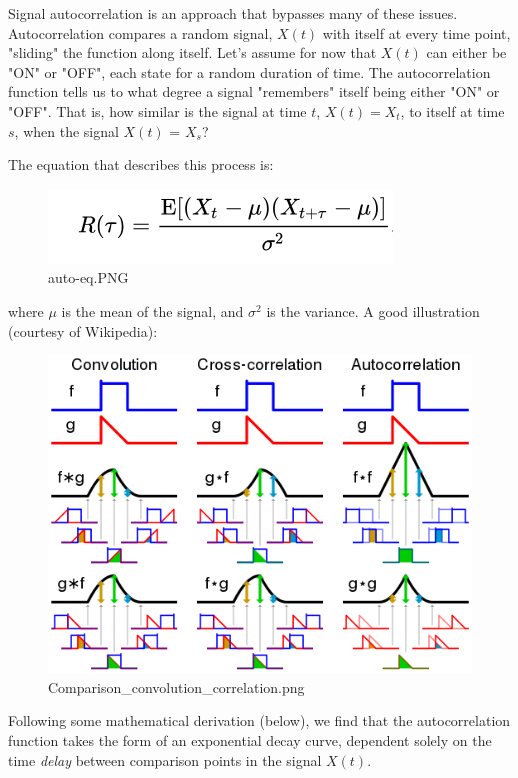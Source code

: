 \documentclass[11pt]{article}
\makeatletter
\def\maxwidth{\ifdim\Gin@nat@width>\linewidth\linewidth
    \else\Gin@nat@width\fi}
\let\Oldincludegraphics\includegraphics
\renewcommand{\includegraphics}[1]{\Oldincludegraphics[width=.8\maxwidth]{#1}}
\makeatother
\begin{document}
Signal autocorrelation is an approach that bypasses many of these
issues. Autocorrelation compares a random signal, \(X(t)\) with itself
at every time point, "sliding" the function along itself. Let's assume
for now that \(X(t)\) can either be "ON" or "OFF", each state for a
random duration of time. The autocorrelation function tells us to what
degree a signal "remembers" itself being either "ON" or "OFF". That is,
how similar is the signal at time \(t\), \(X(t) = X_t\), to itself at
time \(s\), when the signal \(X(t)\) = \(X_s\)?

The equation that describes this process is:

\begin{figure}
\centering
\includegraphics{tutorial/auto-eq.PNG}
\caption{auto-eq.PNG}
\end{figure}

where \(\mu\) is the mean of the signal, and \(\sigma^2\) is the
variance. A good illustration (courtesy of Wikipedia):

\begin{figure}
\centering
\includegraphics{tutorial/Comparison_convolution_correlation.png}
\caption{Comparison\_convolution\_correlation.png}
\end{figure}

Following some mathematical derivation (below), we find that the
autocorrelation function takes the form of an exponential decay curve,
dependent solely on the time \emph{delay} between comparison points in
the signal \(X(t)\).
\end{document}
